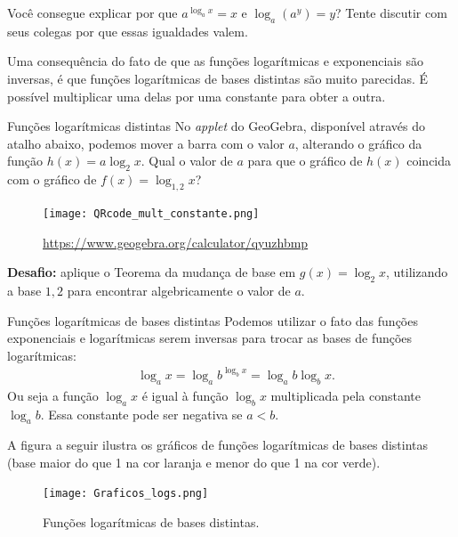 \begin{reflection}
Você consegue explicar por que $a^{\log_a x}=x$ e $\log_a (a^y) = y$? Tente discutir com seus colegas por que essas igualdades valem.
\end{reflection}


Uma consequência do fato de que as funções logarítmicas e exponenciais são inversas, é que funções logarítmicas de bases distintas são muito parecidas. É possível multiplicar uma delas por uma constante para obter a outra.

\vspace{-1em}
\begin{task}{Funções logarítmicas distintas}
No \textit{applet} do GeoGebra, disponível através do atalho abaixo, podemos mover a barra com o valor $a$, alterando o gráfico da função $h(x) = a \log_2 x$. Qual o valor de $a$ para que o gráfico de $h(x)$ coincida com o gráfico de $f(x) = \log_{1{,}2} x$?


\begin{figure}[H]
\centering

\texttt{[image: QRcode\_mult\_constante.png]}

\url{https://www.geogebra.org/calculator/qyuzhbmp}
\end{figure}

\textbf{Desafio:} aplique o Teorema da mudança de base em $g(x)= \log_2 x$, utilizando a base $1{,}2$ para encontrar algebricamente o valor de $a$.
\end{task}


\begin{observation}{Funções logarítmicas de bases distintas}
Podemos utilizar o fato das funções exponenciais e logarítmicas serem inversas para trocar as bases de funções logarítmicas:
\begin{align*}
&\log_a x = \log_a b^{\log_b x} =\log_a b\log_b x.
\end{align*}
Ou seja a função $\log_a x$ é igual à função $\log_b x$ multiplicada pela constante $\log_a b$. Essa constante pode ser negativa se $a<b$.
\end{observation}

A figura a seguir ilustra os gráficos de funções logarítmicas de bases distintas (base maior do que 1 na cor laranja e menor do que 1 na cor verde).

\begin{figure}[!htb]
\centering
\texttt{[image: Graficos\_logs.png]}
\caption{Funções logarítmicas de bases distintas.}
\end{figure}


